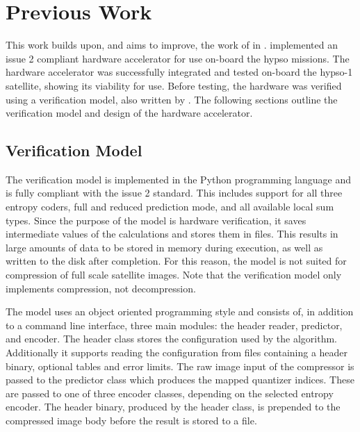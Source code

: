 \chapter{Previous Work}
\label{sec:previous-work}

This work builds upon, and aims to improve, the work of \citeauthor{vorhaugHyperspectralImageCompression2024} in \cite{vorhaugHyperspectralImageCompression2024}. \citeauthor{vorhaugHyperspectralImageCompression2024} implemented an issue 2 compliant hardware accelerator for use on-board the \acrshort{hypso} missions. The hardware accelerator was successfully integrated and tested on-board the \acrshort{hypso}-1 satellite, showing its viability for use. Before testing, the hardware was verified using a verification model, also written by \citeauthor{vorhaugHyperspectralImageCompression2024}. The following sections outline the verification model and design of the hardware accelerator.

\section{Verification Model}

The verification model is implemented in the Python programming language and is fully compliant with the issue 2 standard. This includes support for all three entropy coders, full and reduced prediction mode, and all available local sum types. Since the purpose of the model is hardware verification, it saves intermediate values of the calculations and stores them in files. This results in large amounts of data to be stored in memory during execution, as well as written to the disk after completion. For this reason, the model is not suited for compression of full scale satellite images. Note that the verification model only implements compression, not decompression.

The model uses an object oriented programming style and consists of, in addition to a command line interface, three main modules: the header reader, predictor, and encoder. The header class stores the configuration used by the algorithm. Additionally it supports reading the configuration from files containing a header binary, optional tables and error limits. The raw image input of the compressor is passed to the predictor class which produces the mapped quantizer indices. These are passed to one of three encoder classes, depending on the selected entropy encoder. The header binary, produced by the header class, is prepended to the compressed image body before the result is stored to a file.


